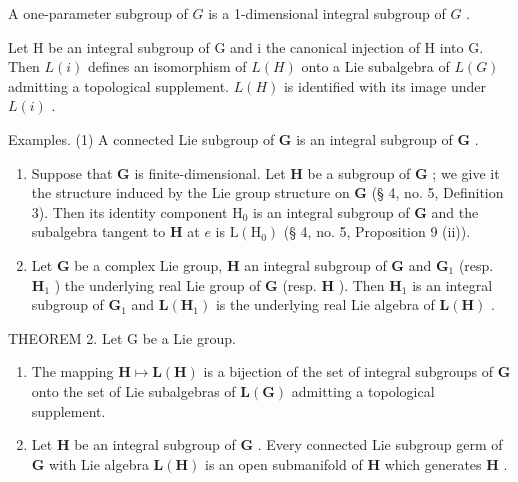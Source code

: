 A one-parameter subgroup of \(G\) is a 1-dimensional integral subgroup of \(G\) .

Let H be an integral subgroup of G and i the canonical injection of H into G. Then \(L(i)\) defines an isomorphism of \(L(H)\) onto a Lie subalgebra of \(L(G)\) admitting a topological supplement. \(L(H)\) is identified with its image under \(L(i)\) .

Examples. (1) A connected Lie subgroup of \(\mathbf{G}\) is an integral subgroup of \(\mathbf{G}\) .

\begin{enumerate}
\def\labelenumi{(\arabic{enumi})}
\setcounter{enumi}{1}
\item
  Suppose that \(\mathbf{G}\) is finite-dimensional. Let \(\mathbf{H}\) be a subgroup of \(\mathbf{G}\) ; we give it the structure induced by the Lie group structure on \(\mathbf{G}\) (§ 4, no. 5, Definition 3). Then its identity component \(\mathrm{H}_0\) is an integral subgroup of \(\mathbf{G}\) and the subalgebra tangent to \(\mathbf{H}\) at \(e\) is \(\mathrm{L}(\mathrm{H}_0)\) (§ 4, no. 5, Proposition 9 (ii)).
\item
  Let \(\mathbf{G}\) be a complex Lie group, \(\mathbf{H}\) an integral subgroup of \(\mathbf{G}\) and \(\mathbf{G}_1\) (resp. \(\mathbf{H}_1\) ) the underlying real Lie group of \(\mathbf{G}\) (resp. \(\mathbf{H}\) ). Then \(\mathbf{H}_1\) is an integral subgroup of \(\mathbf{G}_1\) and \(\mathbf{L}(\mathbf{H}_1)\) is the underlying real Lie algebra of \(\mathbf{L}(\mathbf{H})\) .
\end{enumerate}

THEOREM 2. Let G be a Lie group.

\begin{enumerate}
\def\labelenumi{(\roman{enumi})}
\item
  The mapping \(\mathbf{H} \mapsto \mathbf{L}(\mathbf{H})\) is a bijection of the set of integral subgroups of \(\mathbf{G}\) onto the set of Lie subalgebras of \(\mathbf{L}(\mathbf{G})\) admitting a topological supplement.
\item
  Let \(\mathbf{H}\) be an integral subgroup of \(\mathbf{G}\) . Every connected Lie subgroup germ of \(\mathbf{G}\) with Lie algebra \(\mathbf{L}(\mathbf{H})\) is an open submanifold of \(\mathbf{H}\) which generates \(\mathbf{H}\) .
\end{enumerate}

